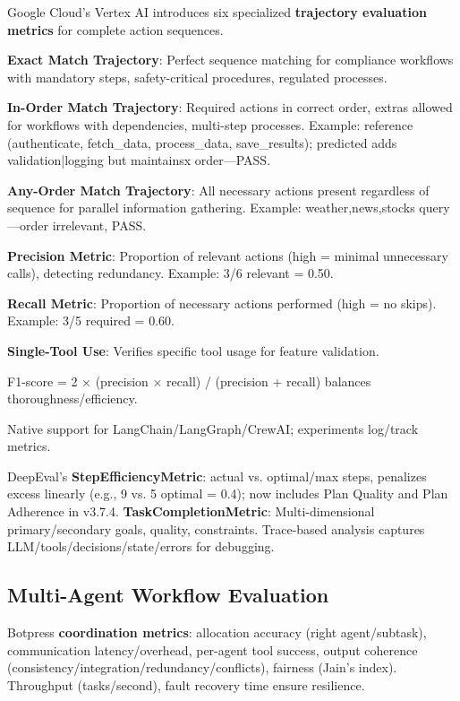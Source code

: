 \begin{TNtwocol}
Google Cloud's Vertex AI introduces six specialized \textbf{trajectory evaluation metrics} for complete action sequences.

\textbf{Exact Match Trajectory}: Perfect sequence matching for compliance workflows with mandatory steps, safety-critical procedures, regulated processes.
​

\textbf{In-Order Match Trajectory}: Required actions in correct order, extras allowed for workflows with dependencies, multi-step processes. Example: reference (authenticate, fetch\_data, process\_data, save\_results); predicted adds validation|logging but maintainsx order—PASS.
​

\textbf{Any-Order Match Trajectory}: All necessary actions present regardless of sequence for parallel information gathering. Example: weather,news,stocks query—order irrelevant, PASS.
​

\textbf{Precision Metric}: Proportion of relevant actions (high = minimal unnecessary calls), detecting redundancy. Example: 3/6 relevant = 0.50.
​

\textbf{Recall Metric}: Proportion of necessary actions performed (high = no skips). Example: 3/5 required = 0.60.
​

\textbf{Single-Tool Use}: Verifies specific tool usage for feature validation.
​

F1-score = 2 × (precision × recall) / (precision + recall) balances thoroughness/efficiency.
​

Native support for LangChain/LangGraph/CrewAI; experiments log/track metrics.
​

DeepEval’s \textbf{StepEfficiencyMetric}: actual vs. optimal/max steps, penalizes excess linearly (e.g., 9 vs. 5 optimal = 0.4); now includes Plan Quality and Plan Adherence in v3.7.4. \textbf{TaskCompletionMetric}: Multi-dimensional primary/secondary goals, quality, constraints. Trace-based analysis captures LLM/tools/decisions/state/errors for debugging.

\subsection*{Multi-Agent Workflow Evaluation}

Botpress \textbf{coordination metrics}: allocation accuracy (right agent/subtask), communication latency/overhead, per-agent tool success, output coherence (consistency/integration/redundancy/conflicts), fairness (Jain's index). Throughput (tasks/second), fault recovery time ensure resilience.
​


\end{TNtwocol}
